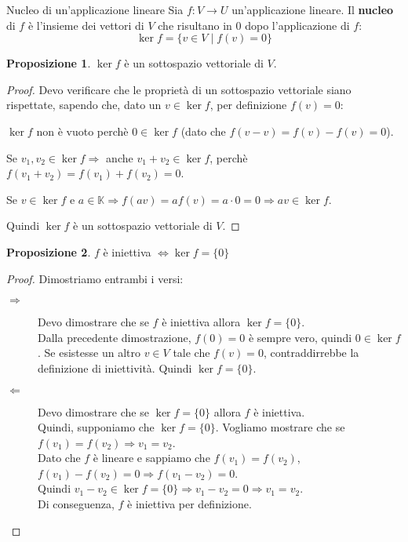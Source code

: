 \documentclass[a4paper]{article}
\theoremstyle{definition}
\newtheorem*{prop}{Proposizione}
\begin{document}
\begin{deff}{Nucleo di un'applicazione lineare}{}
	Sia $f: V \rightarrow U$ un'applicazione lineare.
	Il \textbf{nucleo} di $f$ è l'insieme dei vettori di $V$ che risultano in $0$ dopo l'applicazione di $f$:
	\[ \ker f = \{v \in V \mid f(v) = 0\} \]
\end{deff}
\begin{prop}
	$\ker f$ è un sottospazio vettoriale di $V$.
\end{prop}
\begin{proof}
	Devo verificare che le proprietà di un sottospazio vettoriale siano rispettate, sapendo che, dato un $v \in \ker f$, per definizione $f(v) = 0$:
	\begin{description}
		\item $\ker f$ non è vuoto perchè $0 \in \ker f$ (dato che $f(v - v) = f(v) - f(v) = 0$).
		\item Se $v_1, v_2 \in \ker f \Rightarrow$ anche $v_1 + v_2 \in \ker f$, perchè $f(v_1 + v_2) = f(v_1) + f(v_2) = 0$.
		\item Se $v \in \ker f$ e $a \in \mathbb{K} \Rightarrow f(av) = af(v) = a \cdot 0 = 0 \Rightarrow av \in \ker f$.
	\end{description}
	Quindi $\ker f$ è un sottospazio vettoriale di $V$.
\end{proof}
\begin{prop}
	$f$ è iniettiva $\Leftrightarrow \ker f = \{0\}$
\end{prop}
\begin{proof}
	Dimostriamo entrambi i versi:
	\begin{description}
		\item[$\Rightarrow$] Devo dimostrare che se $f$ è iniettiva allora $\ker f = \{0\}$. \\
		Dalla precedente dimostrazione, $f(0) = 0$ è sempre vero, quindi $0 \in \ker f$.
		Se esistesse un altro $v \in V$ tale che $f(v) = 0$, contraddirrebbe la definizione di iniettività.
		Quindi $\ker f = \{0\}$.
		\item[$\Leftarrow$] Devo dimostrare che se $\ker f = \{0\}$ allora $f$ è iniettiva. \\
		      Quindi, supponiamo che $\ker f = \{0\}$. Vogliamo mostrare che se $f(v_1) = f(v_2) \Rightarrow v_1 = v_2$. \\
		      Dato che $f$ è lineare e sappiamo che $f(v_1) = f(v_2)$, $f(v_1) - f(v_2) = 0 \Rightarrow f(v_1 - v_2) = 0$. \\
		      Quindi $v_1 - v_2 \in \ker f = \{0\} \Rightarrow v_1 - v_2 = 0 \Rightarrow v_1 = v_2$. \\
		      Di conseguenza, $f$ è iniettiva per definizione.
	\end{description}
\end{proof}
\end{document}

